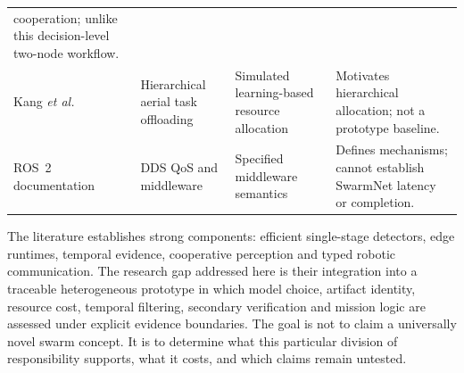 \begin{table}[H]
\begin{tabularx}{\textwidth}{@{}p{}p{}p{}X@{}}
    cooperation; unlike this decision-level two-node workflow. \\
    Kang \emph{et al.} \cite{Kang2023HierarchicalAerial} & Hierarchical aerial
    task offloading & Simulated learning-based resource allocation & Motivates
    hierarchical allocation; not a prototype baseline. \\
    ROS~2 documentation \cite{OpenRoboticsROS2QoS,OpenRoboticsRMW} & DDS QoS and
    middleware & Specified middleware semantics & Defines mechanisms; cannot
    establish SwarmNet latency or completion. \\
    \bottomrule
  \end{tabularx}
\end{table}

The literature establishes strong components: efficient single-stage
detectors, edge runtimes, temporal evidence, cooperative perception and typed
robotic communication. The research gap addressed here is their integration
into a traceable heterogeneous prototype in which model choice, artifact
identity, resource cost, temporal filtering, secondary verification and
mission logic are assessed under explicit evidence boundaries. The goal is not
to claim a universally novel swarm concept. It is to determine what this
particular division of responsibility supports, what it costs, and which
claims remain untested.
